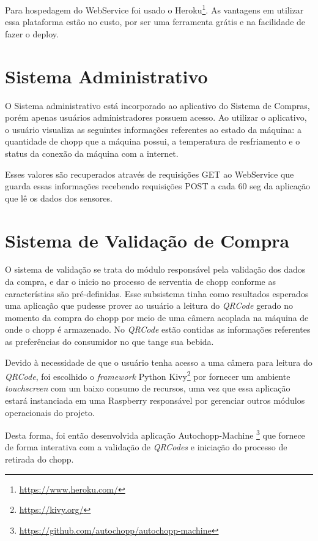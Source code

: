         Para hospedagem do WebService foi usado o Heroku\footnote{\url{https://www.heroku.com/}}.
        As vantagens em utilizar essa plataforma estão no custo, 
        por ser uma ferramenta grátis e na facilidade de fazer o deploy.

    \section[Sistema Administrativo]{Sistema Administrativo}

        O Sistema administrativo está incorporado ao aplicativo do Sistema de Compras, porém apenas usuários
        administradores possuem acesso. Ao utilizar o aplicativo, o usuário visualiza
        as seguintes informações referentes ao estado da máquina: a quantidade de chopp que a
        máquina possui, a temperatura de resfriamento e o status da conexão da máquina com a internet.

        Esses valores são recuperados através de requisições GET ao WebService que guarda essas informações recebendo
        requisições POST a cada 60 seg da aplicação que lê os dados dos sensores. 
    
    \section[Sistema de Validação de Compra]{Sistema de Validação de Compra}
        
        O sistema de validação se trata do módulo responsável pela validação dos dados da compra,
        e dar o inicio no processo de serventia de chopp conforme as característias são pré-definidas.
        Esse subsistema tinha como resultados esperados uma aplicação que pudesse prover ao usuário
        a leitura do \textit{QRCode} gerado no momento da compra do chopp por meio de uma câmera 
        acoplada na máquina de onde o chopp é armazenado. No \textit{QRCode} estão contidas as informações
        referentes as preferências do consumidor no que tange sua bebida.
        
        Devido à necessidade de que o usuário tenha acesso a uma câmera para leitura do \textit{QRCode},
        foi escolhido o \textit{framework} Python Kivy\footnote{\url{https://kivy.org/}} por fornecer um ambiente
        \textit{touchscreen} com um baixo consumo de recursos, uma vez que essa aplicação estará 
        instanciada em uma Raspberry responsável por gerenciar outros módulos operacionais do projeto.

        Desta forma, foi então desenvolvida aplicação Autochopp-Machine \footnote{\url{https://github.com/autochopp/autochopp-machine}} que fornece de forma interativa 
        com a validação de \textit{QRCodes} e iniciação do processo de retirada do chopp. 

